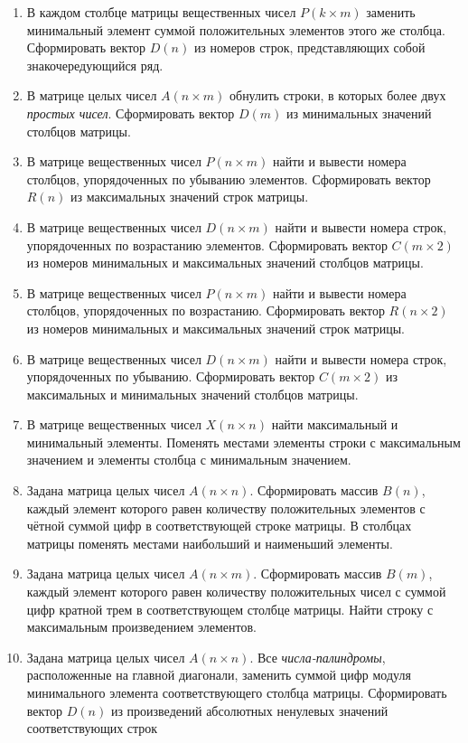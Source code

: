 \begin{enumerate}
\item В каждом столбце матрицы вещественных чисел $P(k\times m)$ заменить
минимальный элемент суммой положительных элементов этого же столбца. Сформировать вектор
$D(n)$ из номеров строк, представляющих собой знакочередующийся ряд.
\item В матрице целых чисел $A(n\times m)$ обнулить строки, в которых более двух
\emph{простых чисел}. Сформировать вектор $D(m)$ из минимальных значений столбцов матрицы.
\item В матрице вещественных чисел $P(n\times m)$ найти и вывести номера столбцов,
упорядоченных по убыванию элементов. Сформировать вектор $R(n)$ из максимальных значений строк
матрицы.
\item В матрице вещественных чисел $D(n\times m)$ найти и вывести номера строк,
упорядоченных по возрастанию элементов. Сформировать вектор $C(m\times 2)$ из
номеров  минимальных и максимальных значений столбцов матрицы.
\item В матрице вещественных чисел $P(n\times m)$ найти и вывести номера столбцов,
упорядоченных по возрастанию. Сформировать вектор $R(n\times 2)$ из номеров  минимальных и
максимальных значений строк матрицы. 
\item В матрице вещественных чисел $D(n\times m)$ найти и вывести номера строк,
упорядоченных по убыванию. Сформировать вектор $C(m\times 2)$ из максимальных и
минимальных значений столбцов матрицы.
\item В матрице вещественных чисел $X(n\times n)$ найти максимальный и минимальный элементы. Поменять
местами элементы строки с максимальным значением и элементы столбца с минимальным значением.
\item Задана матрица целых чисел $A(n\times n)$. Сформировать массив $B(n)$,
каждый элемент которого равен количеству положительных элементов с чётной суммой цифр в  соответствующей строке
матрицы. В столбцах матрицы поменять местами наибольший и наименьший элементы.
\item Задана матрица целых чисел $A(n\times m)$. Сформировать массив
$B(m)$, каждый элемент которого равен количеству положительных чисел с суммой цифр кратной
трем в  соответствующем столбце матрицы. Найти строку с максимальным произведением элементов.
\item Задана матрица целых чисел $A(n\times n)$. Все \emph{числа-палиндромы},
расположенные на главной диагонали, заменить суммой цифр модуля минимального элемента соответствующего столбца матрицы.
Сформировать вектор $D(n)$ из произведений абсолютных ненулевых значений соответствующих строк

\end{enumerate}
